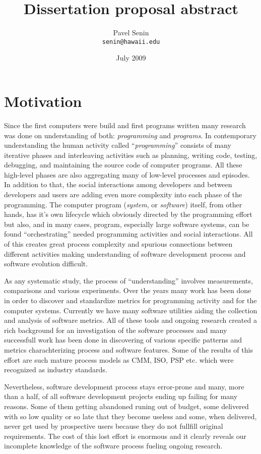 \documentclass[11pt,oneside]{article}
\begin{document}
\title{Dissertation proposal abstract}
\author{Pavel Senin \\
 \texttt{senin@hawaii.edu}
}
\date{July 2009}
\maketitle

\section{Motivation}
Since the first computers were build and first programs written many research was done on understanding of both: \textit{programming} and \textit{programs}. In contemporary understanding the human activity called ``\textit{programming}'' consists of many iterative phases and interleaving activities such as planning, writing code, testing, debugging, and maintaining the source code of computer programs. All these high-level phases are also aggregating many of low-level processes and episodes. In addition to that, the social interactions among developers and between developers and users are adding even more complexity into each phase of the programming. The computer program (\textit{system}, or \textit{software}) itself, from other hands, has it's own lifecycle which obviously directed by the programming effort but also, and in many cases, program, especially large software systems, can be found ``orchestrating'' needed programming activities and social interactions. All of this creates great process complexity and spurious connections between different activities making understanding of software development process and software evolution difficult.

As any systematic study, the process of ``understanding'' involves measurements, comparisons and various experiments. Over the years many work has been done in order to discover and standardize metrics for programming activity and for the computer systems. Currently we have many software utilities aiding the collection and analysis of software metrics. All of these tools and ongoing research created a rich background for an investigation of the software processes and many successfull work has been done in discovering of various specific patterns and metrics charachterizing process and software features. Some of the results of this effort are such mature process models as CMM, ISO, PSP etc. which were recognized as industry standards.

Nevertheless, software development process stays error-prone and many, more than a half, of all software development projects ending up failing for many reasons. Some of them getting abandoned runing out of budget, some delivered with so low quality or so late that they become useless and some, when delivered, never get used by prospective users because they do not fullfill original requirements. The cost of this lost effort is enormous and it clearly reveals our incomplete knowledge of the software process fueling ongoing research. 
\end{document}
